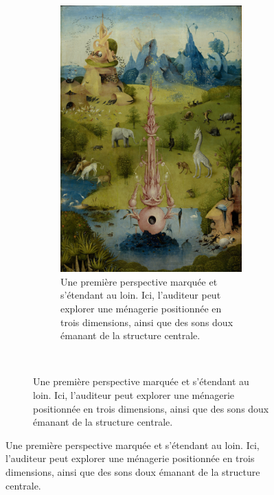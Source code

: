 
    \begin{landscape}
        \footnotesize
    \begin{figure}
        \thispagestyle{empty}
        \begin{subfigure}[t]{0.3\textwidth}\vskip 0pt
            \centering
            \begin{subfigure}[t]{\textwidth}\vskip 0pt
                \centering
                \includegraphics[width=\textwidth]{images/A1.png}
                \caption{Une première perspective marquée et s'étendant au loin. Ici, l'auditeur peut explorer une ménagerie positionnée en trois dimensions, ainsi que des sons doux émanant de la structure centrale.}
                \label{fig.a1}
            \end{subfigure}~\\       

\end{subfigure}
\end{figure}
\end{landscape}
